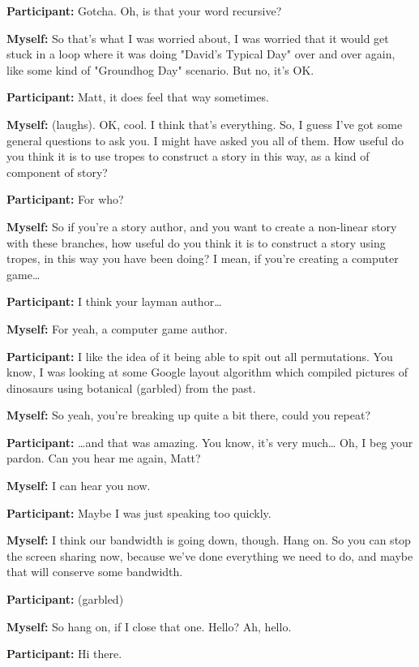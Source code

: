 \documentclass[11pt]{report}
\newcommand{\llabel}[1]{\hypertarget{llineno:#1}{\linelabel{#1}}}
\begin{document}
\begin{linenumbers}
\textbf{Participant:} Gotcha. Oh, is that your word recursive?

\textbf{Myself:} So that's what I was worried about, I was worried that it would get stuck in a loop where it was doing "David's Typical Day" over and over again, like some kind of "Groundhog Day" scenario. But no, it's OK.

\textbf{Participant:} Matt, it does feel that way sometimes.

\textbf{Myself:} (laughs). OK, cool. I think that's everything. So, I guess I've got some general questions to ask you. I might have asked you all of them. How useful do you think it is to use tropes to construct a story in this way, as a kind of component of story?

\textbf{Participant:} For who?

\textbf{Myself:} So if you're a story author, and you want to create a non-linear story with these branches, how useful do you think it is to construct a story using tropes, in this way you have been doing? I mean, if you're creating a computer game\ldots{}

\textbf{Participant:} I think your layman author\ldots{}

\textbf{Myself:} For yeah, a computer game author.

\textbf{Participant:} I like the idea of it being able to spit out all permutations. You know, I was looking at some Google layout algorithm which compiled pictures of dinosaurs using botanical (garbled) from the past.\llabel{lne:use2b}

\textbf{Myself:} So yeah, you're breaking up quite a bit there, could you repeat?

\textbf{Participant:} \ldots{}and that was amazing. You know, it's very much\ldots{} Oh, I beg your pardon. Can you hear me again, Matt?

\textbf{Myself:} I can hear you now.

\textbf{Participant:} Maybe I was just speaking too quickly.

\textbf{Myself:} I think our bandwidth is going down, though. Hang on. So you can stop the screen sharing now, because we've done everything we need to do, and maybe that will conserve some bandwidth.

\textbf{Participant:} (garbled)

\textbf{Myself:} So hang on, if I close that one. Hello? Ah, hello.

\textbf{Participant:} Hi there.


\end{linenumbers}
\end{document}
